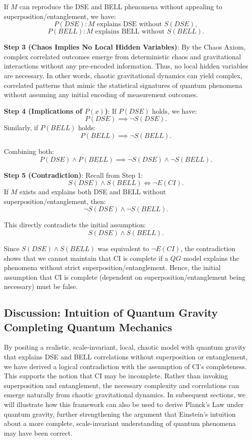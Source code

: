 \documentclass{report}
\begin{document}
If $M$ can reproduce the DSE and BELL phenomena without appealing to superposition/entanglement, we have:
\[
P(DSE): M \text{ explains DSE without } S(DSE),
\]
\[
P(BELL): M \text{ explains BELL without } S(BELL).
\]

\textbf{Step 3 (Chaos Implies No Local Hidden Variables)}:
By the Chaos Axiom, complex correlated outcomes emerge from deterministic chaos and gravitational interactions without any pre-encoded information. Thus, no local hidden variables are necessary. In other words, chaotic gravitational dynamics can yield complex, correlated patterns that mimic the statistical signatures of quantum phenomena without assuming any initial encoding of measurement outcomes.

\textbf{Step 4 (Implications of $P(x)$)}:
If $P(DSE)$ holds, we have:
\[
P(DSE) \implies \neg S(DSE).
\]
Similarly, if $P(BELL)$ holds:
\[
P(BELL) \implies \neg S(BELL).
\]

Combining both:
\[
P(DSE) \wedge P(BELL) \implies \neg S(DSE) \wedge \neg S(BELL).
\]

\textbf{Step 5 (Contradiction)}:
Recall from Step 1:
\[
S(DSE) \wedge S(BELL) \iff \neg E(CI).
\]
If $M$ exists and explains both DSE and BELL without superposition/entanglement, then:
\[
\neg S(DSE) \wedge \neg S(BELL).
\]

This directly contradicts the initial assumption:
\[
S(DSE) \wedge S(BELL).
\]

Since $S(DSE) \wedge S(BELL)$ was equivalent to $\neg E(CI)$, the contradiction shows that we cannot maintain that CI is complete if a $QG$ model explains the phenomena without strict superposition/entanglement. Hence, the initial assumption that CI is complete (dependent on superposition/entanglement being necessary) must be false.

\subsection*{Discussion: Intuition of Quantum Gravity Completing Quantum Mechanics}

By positing a realistic, scale-invariant, local, chaotic model with quantum gravity that explains DSE and BELL correlations without superposition or entanglement, we have derived a logical contradiction with the assumption of CI's completeness. This supports the notion that CI may be incomplete. Rather than invoking superposition and entanglement, the necessary complexity and correlations can emerge naturally from chaotic gravitational dynamics. In subsequent sections, we will illustrate how this framework can also be used to derive Planck’s Law under quantum gravity, further strengthening the argument that Einstein’s intuition about a more complete, scale-invariant understanding of quantum phenomena may have been correct.
\end{document}
